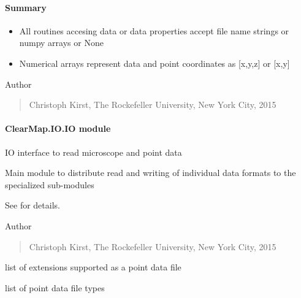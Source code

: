 \documentclass[letterpaper,10pt,english]{sphinxmanual}
\begin{document}
\paragraph{Summary}
\label{api/ClearMap.IO:summary}\begin{itemize}
\item {} 
All routines accesing data or data properties accept file name strings or numpy arrays or None

\item {} 
Numerical arrays represent data and point coordinates as {[}x,y,z{]} or {[}x,y{]}

\end{itemize}

Author
\begin{quote}

Christoph Kirst, The Rockefeller University, New York City, 2015
\end{quote}


\paragraph{ClearMap.IO.IO module}
\label{api/ClearMap.IO:clearmap-io-io-module}\label{api/ClearMap.IO:module-ClearMap.IO.IO}
IO interface to read microscope and point data

Main module to distribute read and writing of individual data formats
to the specialized sub-modules

See {\hyperref[api/ClearMap.IO:module-ClearMap.IO]{\emph{}}} for details.

Author
\begin{quote}

Christoph Kirst, The Rockefeller University, New York City, 2015
\end{quote}

\begin{fulllineitems}
\label{api/ClearMap.IO:ClearMap.IO.IO.pointFileExtensions}
list of extensions supported as a point data file

\end{fulllineitems}


\begin{fulllineitems}
\label{api/ClearMap.IO:ClearMap.IO.IO.pointFileTypes}
list of point data file types

\end{fulllineitems}
\end{document}

